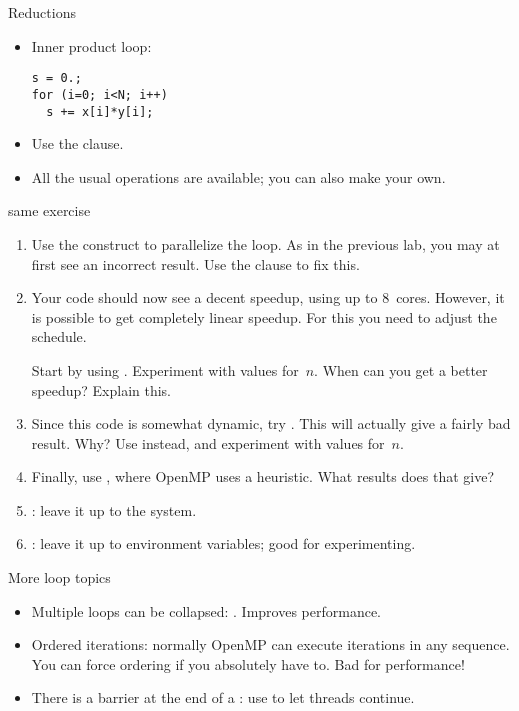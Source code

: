 \begin{frame}[containsverbatim]{Reductions}
  \begin{itemize}
  \item Inner product loop:
\begin{verbatim}
s = 0.;
for (i=0; i<N; i++)
  s += x[i]*y[i];
\end{verbatim}
\item Use the  clause.
  \item All the usual operations are available; you can also make your own.
  \end{itemize}
\end{frame}

\begin{exerciseframe}[piadapt]
  \footnotesize
  
\end{exerciseframe}

\begin{frame}[containsverbatim]{same exercise}
  \begin{enumerate}
  \item Use the  construct to parallelize the loop.
    As in the previous lab, you may at first see an incorrect result.
    Use the  clause to fix this.
  \item Your code should now see a decent speedup, using up to 8~cores.
    However, it is possible to get completely linear speedup. For this
    you need to adjust the schedule.

    Start by using . Experiment with values
    for~$n$.  When can you get a better speedup? Explain this.
  \item Since this code is somewhat dynamic, try .
    This will actually give a fairly bad result. Why?  Use
     instead, and experiment with values
    for~$n$.
  \item Finally, use , where OpenMP uses a
    heuristic.  What results does that give?
  \item {} : leave it up to the system.
  \item {} : leave it up to environment variables;
    good for experimenting.
  \end{enumerate}
\end{frame}

\begin{frame}[containsverbatim]{More loop topics}
  \begin{itemize}
  \item Multiple loops can be collapsed: . Improves
    performance.
  \item Ordered iterations: normally OpenMP can execute iterations in
    any sequence. You can force ordering if you absolutely have
    to. Bad for performance!
  \item There is a barrier at the end of a : use  to
    let threads continue.
  \end{itemize}
\end{frame}

